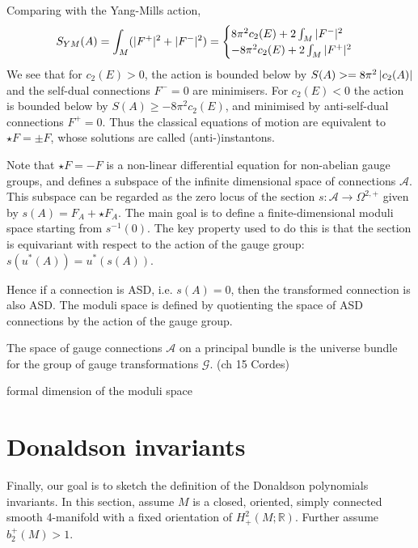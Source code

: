 Comparing with the Yang-Mills action, 
\begin{align*}
	S_{YM}(A) = \int_M (\abs[*]{F^+}^2+\abs[*]{F^-}^2) 
	= \begin{cases}
		8\pi^2 c_2(E) + 2\int_M \abs[*]{F^-}^2 \\
		-8\pi^2 c_2(E) + 2\int_M \abs[*]{F^+}^2
	\end{cases}
\end{align*}
We see that for $c_2(E)>0$, the action is bounded below by 
$S(A) >= 8\pi^2\abs{c_2(A)}$ and the self-dual connections $F^-=0$ are
minimisers. For $c_2(E)<0$ the action is bounded
below by $S(A)\geq -8\pi^2c_2(E)$, and minimised by anti-self-dual connections
$F^+=0$. 
Thus the classical equations of motion are equivalent to $\star F = \pm F$,
whose solutions are called (anti-)instantons. 

Note that $\star F = - F$ is a non-linear differential equation for
non-abelian gauge groups, and defines a subspace of the infinite dimensional
space of connections $\mathcal{A}$. This subspace can be regarded as the zero
locus of the section $s : \mathcal{A} \to \Omega^{2,+}$ given by $s(A) =
F_A+\star F_A$. The main goal is to define a finite-dimensional moduli space
starting from  $s^{-1}(0)$. 
The key property used to do this is that the section is equivariant with respect
to the action of the gauge group: $s(u^*(A))=u^*(s(A))$.

Hence if a connection is ASD, i.e. $s(A)=0$, then the transformed connection is
also ASD. The moduli space is defined by quotienting the space of ASD
connections by the action of the gauge group. 



The space of gauge connections $\mathcal{A}$ on a principal bundle is the
universe bundle for the group of gauge transformations $\mathcal{G}$. (ch 15
Cordes)


formal dimension of the moduli space

\section{Donaldson invariants}
Finally, our goal is to sketch the definition of the Donaldson polynomials
invariants. 
In this section, assume $M$ is a closed,
oriented, simply connected smooth 4-manifold with a fixed orientation of
$H^2_+(M;\mathbb{R})$. Further assume $b_2^+(M) > 1$. 

